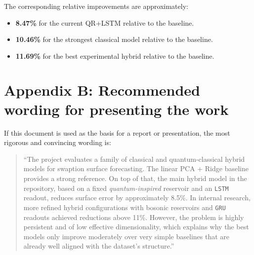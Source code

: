 \documentclass[11pt,a4paper]{article}
\begin{document}
The corresponding relative improvements are approximately:

\begin{itemize}
    \item \textbf{8.47\%} for the current QR+LSTM relative to the baseline.
    \item \textbf{10.46\%} for the strongest classical model relative to the baseline.
    \item \textbf{11.69\%} for the best experimental hybrid relative to the baseline.
\end{itemize}

\section*{Appendix B: Recommended wording for presenting the work}

If this document is used as the basis for a report or presentation, the most rigorous and convincing wording is:

\begin{quote}
``The project evaluates a family of classical and quantum-classical hybrid models for swaption surface forecasting. The linear PCA + Ridge baseline provides a strong reference. On top of that, the main hybrid model in the repository, based on a fixed \textit{quantum-inspired} reservoir and an \texttt{LSTM} readout, reduces surface error by approximately 8.5\%. In internal research, more refined hybrid configurations with bosonic reservoirs and \texttt{GRU} readouts achieved reductions above 11\%. However, the problem is highly persistent and of low effective dimensionality, which explains why the best models only improve moderately over very simple baselines that are already well aligned with the dataset’s structure.''
\end{quote}
\end{document}
